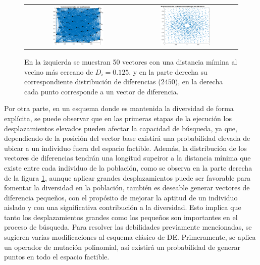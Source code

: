 %
\begin{figure}%
\centering
\begin{tabular}{cc}
   \includegraphics[width=0.5\textwidth]{Figures_Chapter6/Diferencias_Puntos_Diversidad.eps} &
   \includegraphics[width=0.5\textwidth]{Figures_Chapter6/Distribucion_Mutacion_Diversidad.eps} 
\end{tabular}
\caption{En la izquierda se muestran 50 vectores con una distancia mímina al vecino más cercano de $D_i = 0.125$, y en la parte derecha su correspondiente distribución de diferencias ($2450$), en la derecha cada punto corresponde a un vector de diferencia.}
\label{fig:Distribucion_Mutacion_Diversidad}
\end{figure}


Por otra parte, en un esquema donde es mantenida la diversidad de forma explícita, se puede observar que en las primeras etapas de la ejecución los desplazamientos elevados pueden afectar la capacidad de búsqueda, ya que, dependiendo de la posición del vector base existirá una probabilidad elevada de ubicar a un individuo fuera del espacio factible.
%
Además, la distribución de los vectores de diferencias tendrán una longitud supeiror a la distancia mínima que existe entre cada individuo de la población, como se observa en la parte derecha de la figura \ref{fig:Distribucion_Mutacion_Diversidad}, aunque aplicar grandes desplazamientos puede ser favorable para fomentar la diversidad en la población, también es deseable generar vectores de diferencia pequeños, con el propósito de mejorar la aptitud de un individuo aislado y con una significativa contribución a la diversidad.
%
Esto implica que tanto los desplazamientos grandes como los pequeños son importantes en el proceso de búsqueda.
%
Para resolver las debilidades previamente mencionadas, se sugieren varias modificaciones al esquema clásico de DE.
%
Primeramente, se aplica un operador de mutación polinomial, así existirá un probabilidad de generar puntos en todo el espacio factible.
%

